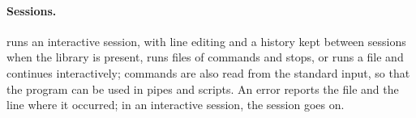 \paragraph{Sessions.}
 runs an interactive session, with line editing and a history kept between sessions when the
 library is present, runs files of commands and stops, or runs a file and continues interactively;
commands are also read from the standard input, so that the program can be used in pipes and scripts. An error
reports the file and the line where it occurred; in an interactive session, the session goes on.
